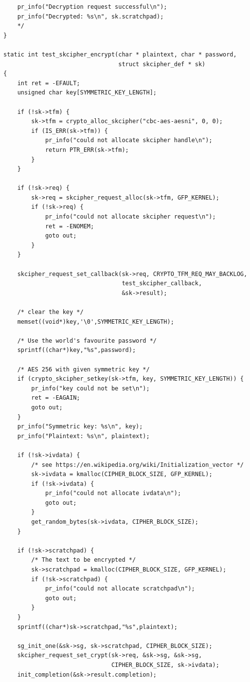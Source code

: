 \documentclass[11pt]{article}
\begin{document}
\begin{verbatim}
    pr_info("Decryption request successful\n");
    pr_info("Decrypted: %s\n", sk.scratchpad);
    */
}

static int test_skcipher_encrypt(char * plaintext, char * password,
                                 struct skcipher_def * sk)
{
    int ret = -EFAULT;
    unsigned char key[SYMMETRIC_KEY_LENGTH];

    if (!sk->tfm) {
        sk->tfm = crypto_alloc_skcipher("cbc-aes-aesni", 0, 0);
        if (IS_ERR(sk->tfm)) {
            pr_info("could not allocate skcipher handle\n");
            return PTR_ERR(sk->tfm);
        }
    }

    if (!sk->req) {
        sk->req = skcipher_request_alloc(sk->tfm, GFP_KERNEL);
        if (!sk->req) {
            pr_info("could not allocate skcipher request\n");
            ret = -ENOMEM;
            goto out;
        }
    }

    skcipher_request_set_callback(sk->req, CRYPTO_TFM_REQ_MAY_BACKLOG,
                                  test_skcipher_callback,
                                  &sk->result);

    /* clear the key */
    memset((void*)key,'\0',SYMMETRIC_KEY_LENGTH);

    /* Use the world's favourite password */
    sprintf((char*)key,"%s",password);

    /* AES 256 with given symmetric key */
    if (crypto_skcipher_setkey(sk->tfm, key, SYMMETRIC_KEY_LENGTH)) {
        pr_info("key could not be set\n");
        ret = -EAGAIN;
        goto out;
    }
    pr_info("Symmetric key: %s\n", key);
    pr_info("Plaintext: %s\n", plaintext);

    if (!sk->ivdata) {
        /* see https://en.wikipedia.org/wiki/Initialization_vector */
        sk->ivdata = kmalloc(CIPHER_BLOCK_SIZE, GFP_KERNEL);
        if (!sk->ivdata) {
            pr_info("could not allocate ivdata\n");
            goto out;
        }
        get_random_bytes(sk->ivdata, CIPHER_BLOCK_SIZE);
    }

    if (!sk->scratchpad) {
        /* The text to be encrypted */
        sk->scratchpad = kmalloc(CIPHER_BLOCK_SIZE, GFP_KERNEL);
        if (!sk->scratchpad) {
            pr_info("could not allocate scratchpad\n");
            goto out;
        }
    }
    sprintf((char*)sk->scratchpad,"%s",plaintext);

    sg_init_one(&sk->sg, sk->scratchpad, CIPHER_BLOCK_SIZE);
    skcipher_request_set_crypt(sk->req, &sk->sg, &sk->sg,
                               CIPHER_BLOCK_SIZE, sk->ivdata);
    init_completion(&sk->result.completion);


\end{verbatim}
\end{document}
